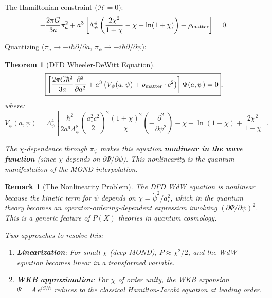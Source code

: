 \documentclass[11pt,a4paper]{article}
\newtheorem{theorem}{Theorem}
\newtheorem{remark}{Remark}
\begin{document}
The Hamiltonian constraint ($\mathcal{H} = 0$):
\begin{equation}
-\frac{2\pi G}{3a}\pi_a^2 + a^3\left[\Lambda_\psi^4\left(\frac{2\chi^2}{1+\chi} - \chi + \ln(1+\chi)\right) + \rho_{\rm matter}\right] = 0.
\end{equation}

Quantizing ($\pi_a \to -i\hbar\partial/\partial a$, $\pi_\psi \to -i\hbar\partial/\partial\psi$):

\begin{theorem}[DFD Wheeler-DeWitt Equation]
\label{thm:WdW}
\begin{equation}\label{eq:WdW}
\boxed{\left[\frac{2\pi G\hbar^2}{3a}\frac{\partial^2}{\partial a^2} + a^3\left(V_\psi(a,\psi) + \rho_{\rm matter}\cdot c^2\right)\right]\Psi(a,\psi) = 0},
\end{equation}
where:
\begin{equation}
V_\psi(a,\psi) = \Lambda_\psi^4\left[\frac{\hbar^2}{2a^6\Lambda_\psi^8}\left(\frac{a_\star^2 c^2}{2}\right)^2\frac{(1+\chi)^2}{\chi}\left(-\frac{\partial^2}{\partial\psi^2}\right) - \chi + \ln(1+\chi) + \frac{2\chi^2}{1+\chi}\right].
\end{equation}

The $\chi$-dependence through $\pi_\psi$ makes this equation \textbf{nonlinear in the wave function} (since $\chi$ depends on $\partial\Psi/\partial\psi$). This nonlinearity is the quantum manifestation of the MOND interpolation.
\end{theorem}

\begin{remark}[The Nonlinearity Problem]
The DFD WdW equation is nonlinear because the kinetic term for $\psi$ depends on $\chi = \dot\psi^2/a_\star^2$, which in the quantum theory becomes an operator-ordering-dependent expression involving $(\partial\Psi/\partial\psi)^2$. This is a generic feature of $P(X)$ theories in quantum cosmology.

Two approaches to resolve this:
\begin{enumerate}
\item \textbf{Linearization}: For small $\chi$ (deep MOND), $P \approx \chi^2/2$, and the WdW equation becomes linear in a transformed variable.
\item \textbf{WKB approximation}: For $\chi$ of order unity, the WKB expansion $\Psi = A\,e^{iS/\hbar}$ reduces to the classical Hamilton-Jacobi equation at leading order.
\end{enumerate}
\end{remark}
\end{document}
